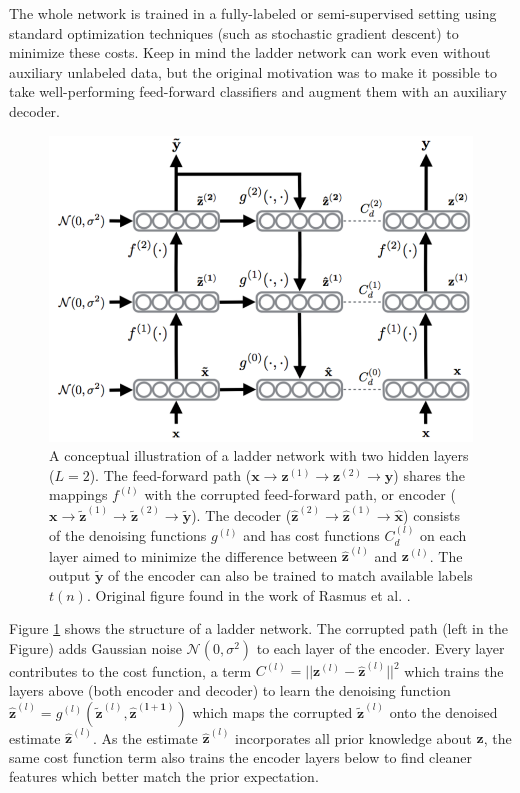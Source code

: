 The whole network is trained in a fully-labeled or semi-supervised setting
using standard optimization techniques (such as stochastic gradient descent) to
minimize these costs. Keep in mind the ladder network can work even without
auxiliary unlabeled data, but the original motivation was to make it possible
to take well-performing feed-forward classifiers and augment them with an
auxiliary decoder.

\begin{figure}[ht]
  \centering
  \includegraphics[width=\textwidth]{images/ladder_architecture}
  \caption{
    A conceptual illustration of a ladder network with two hidden layers ($L =
    2$). The feed-forward path ($\mathbf{x} \rightarrow \mathbf{z}^{(1)}
    \rightarrow \mathbf{z}^{(2)} \rightarrow \mathbf{y}$) shares the mappings
    $f^{(l)}$ with the corrupted feed-forward path, or encoder ($\mathbf{x}
    \rightarrow \mathbf{\tilde{z}}^{(1)} \rightarrow \mathbf{\tilde{z}}^{(2)}
    \rightarrow \mathbf{\tilde{y}}$). The decoder ($\mathbf{\hat{z}}^{(2)}
    \rightarrow \mathbf{\hat{z}}^{(1)} \rightarrow \mathbf{\hat{x}}$) consists
    of the denoising functions $g^{(l)}$ and has cost functions $C^{(l)}_{d}$
    on each layer aimed to minimize the difference between
    $\mathbf{\hat{z}}^{(l)}$ and $\mathbf{z}^{(l)}$. The output
    $\mathbf{\tilde{y}}$ of the encoder can also be trained to match available
    labels $t(n)$. Original figure found in the work of Rasmus et al.
    \cite{Rasmus:2015aa}.
  }
  \label{fig:ladder:architecture}
\end{figure}

Figure \ref{fig:ladder:architecture} shows the structure of a ladder network.
The corrupted path (left in the Figure) adds Gaussian noise $\mathcal{N}(0,
\sigma^{2})$ to each layer of the encoder. Every layer contributes to the cost
function, a term $C^{(l)} = ||\mathbf{z}^{(l)} - \mathbf{\hat{z}}^{(l)}||^{2}$
which trains the layers above (both encoder and decoder) to learn the denoising
function $\mathbf{\hat{z}}^{(l)} = g^{(l)}(\mathbf{\tilde{z}}^{(l)},
\mathbf{\hat{z}^{(l+1)}})$ which maps the corrupted $\mathbf{\tilde{z}}^{(l)}$
onto the denoised estimate $\mathbf{\hat{z}}^{(l)}$. As the estimate
$\mathbf{\hat{z}}^{(l)}$ incorporates all prior knowledge about $\mathbf{z}$,
the same cost function term also trains the encoder layers below to find
cleaner features which better match the prior expectation.

